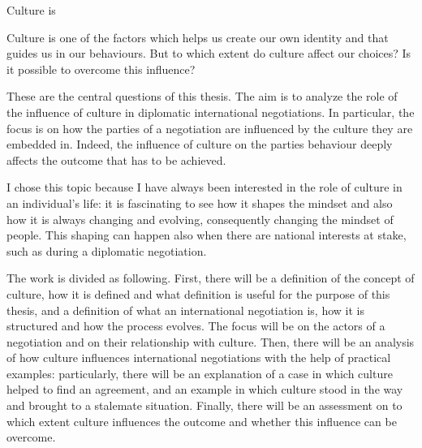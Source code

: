 \documentclass[../main.tex]{subfiles}
\begin{document}

Culture is 

Culture is one of the factors which helps us create our own identity and that guides us in our behaviours. But to which extent do culture affect our choices? Is it possible to overcome this influence?

These are the central questions of this thesis. The aim is to analyze the role of the influence of culture in diplomatic international negotiations. In particular, the focus is on how the parties of a negotiation are influenced by the culture they are embedded in. Indeed, the influence of culture on the parties behaviour deeply affects the outcome that has to be achieved.

I chose this topic because I have always been interested in the role of culture in an individual's life: it is fascinating to see how it shapes the mindset and also how it is always changing and evolving, consequently changing the mindset of people. This shaping can happen also when there are national interests at stake, such as during a diplomatic negotiation.  %

The work is divided as following. First, there will be a definition of the concept of culture, how it is defined and what definition is useful for the purpose of this thesis, and a definition of what an international negotiation is, how it is structured and how the process evolves. The focus will be on the actors of a negotiation and on their relationship with culture. Then, there will be an analysis of how culture influences international negotiations with the help of practical examples: particularly, there will be an explanation of a case in which culture helped to find an agreement, and an example in which culture stood in the way and brought to a stalemate situation. Finally, there will be an assessment on to which extent culture influences the outcome and whether this influence can be overcome. %

\end{document}
